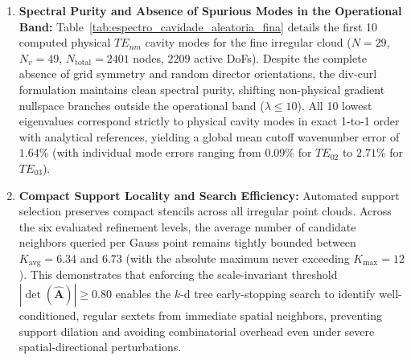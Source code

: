 \documentclass[preprint,12pt]{elsarticle}
\begin{document}
\begin{enumerate}
    \item \textbf{Spectral Purity and Absence of Spurious Modes in the Operational Band:} Table~\ref{tab:espectro_cavidade_aleatoria_fina} details the first 10 computed physical $TE_{nm}$ cavity modes for the fine irregular cloud ($N = 29$, $N_v = 49$, $N_{\mathrm{total}} = 2401$ nodes, $2209$ active DoFs). Despite the complete absence of grid symmetry and random director orientations, the div-curl formulation maintains clean spectral purity, shifting non-physical gradient nullspace branches outside the operational band ($\lambda \le 10$). All 10 lowest eigenvalues correspond strictly to physical cavity modes in exact 1-to-1 order with analytical references, yielding a global mean cutoff wavenumber error of $1.64\%$ (with individual mode errors ranging from $0.09\%$ for $TE_{02}$ to $2.71\%$ for $TE_{03}$).

    \item \textbf{Compact Support Locality and Search Efficiency:} Automated support selection preserves compact stencils across all irregular point clouds. Across the six evaluated refinement levels, the average number of candidate neighbors queried per Gauss point remains tightly bounded between $K_{\mathrm{avg}} = 6.34$ and $6.73$ (with the absolute maximum never exceeding $K_{\mathrm{max}} = 12$). This demonstrates that enforcing the scale-invariant threshold $|\det(\widehat{\mathbf{A}})| \ge 0.80$ enables the $k$-d tree early-stopping search to identify well-conditioned, regular sextets from immediate spatial neighbors, preventing support dilation and avoiding combinatorial overhead even under severe spatial-directional perturbations.
\end{enumerate}
\end{document}
